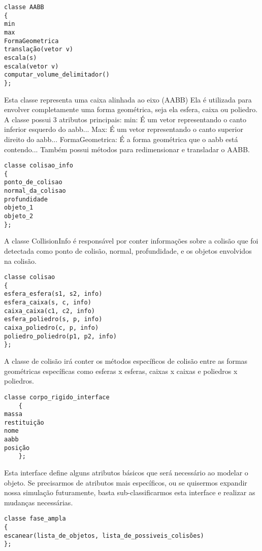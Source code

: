 \begin{lstlisting}[frame=single,caption=Código de exemplo\label{codigo1}]
classe AABB
{
min
max
FormaGeometrica
translação(vetor v)
escala(s)
escala(vetor v)
computar_volume_delimitador()
};
\end{lstlisting}

Esta classe representa uma caixa alinhada ao eixo (AABB) Ela é utilizada para
envolver completamente uma forma geométrica, seja ela esfera, caixa ou
poliedro.
A classe possui 3 atributos principais:
min: É um vetor representando o canto inferior esquerdo do aabb...
Max: É um vetor representando o canto superior direito do aabb...
FormaGeometrica: É a forma geométrica que o aabb está contendo...
Também possui métodos para redimensionar e transladar o AABB.

\begin{lstlisting}[frame=single,caption=Código de exemplo\label{codigo1}]
classe colisao_info
{
ponto_de_colisao
normal_da_colisao
profundidade
objeto_1
objeto_2
};
\end{lstlisting}

A classe CollisionInfo é responsável por conter informações sobre a colisão que
foi detectada como ponto de colisão, normal, profundidade, e os objetos
envolvidos na colisão.

\begin{lstlisting}[frame=single,caption=Código de exemplo\label{codigo1}]
classe colisao
{
esfera_esfera(s1, s2, info)
esfera_caixa(s, c, info)
caixa_caixa(c1, c2, info)
esfera_poliedro(s, p, info)
caixa_poliedro(c, p, info)
poliedro_poliedro(p1, p2, info)
};
\end{lstlisting}

A classe de colisão irá conter os métodos específicos de colisão entre as
formas geométricas específicas como esferas x esferas, caixas x caixas e
poliedros x poliedros.

\begin{lstlisting}[frame=single,caption=Código de exemplo\label{codigo1}]
classe corpo_rigido_interface
    {
massa
restituição
nome
aabb
posição
    };
\end{lstlisting}

Esta interface define alguns atributos básicos que será necessário ao modelar o
objeto. Se precisarmos de atributos mais específicos, ou se quisermos expandir
nossa simulação futuramente, basta sub-classificarmos esta interface e realizar
as mudanças necessárias.

\begin{lstlisting}[frame=single,caption=Código de exemplo\label{codigo1}]
classe fase_ampla
{
escanear(lista_de_objetos, lista_de_possiveis_colisões)
};
\end{lstlisting}

